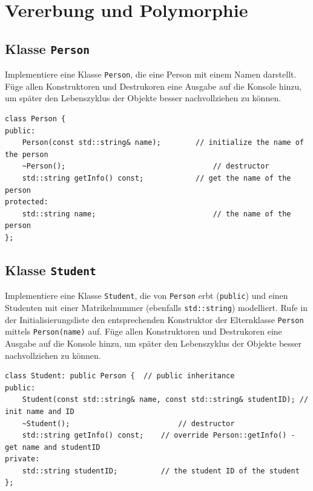 

\newcommand{\exday}{3}

\cppSetTitle



\cppSetHeaderAndMakeTitle

\section{Vererbung und Polymorphie}
\subsection{Klasse \texttt{Person}}
Implementiere eine Klasse \texttt{Person}, die eine Person mit einem Namen darstellt.
Füge allen Konstruktoren und Destrukoren eine Ausgabe auf die Konsole hinzu, um später den Lebenszyklus der Objekte besser nachvollziehen zu können.

\begin{lstlisting}
class Person {
public:
	Person(const std::string& name);		// initialize the name of the person
	~Person();									// destructor
	std::string getInfo() const;			// get the name of the person
protected:
	std::string name;							// the name of the person
};
\end{lstlisting}


\subsection{Klasse \texttt{Student}}
Implementiere eine Klasse \texttt{Student}, die von \texttt{Person} erbt (\texttt{public}) und einen Studenten mit einer Matrikelnummer (ebenfalls \texttt{std::string}) modelliert.
Rufe in der Initialisierungsliste den entsprechenden Konstruktor der Elternklasse \texttt{Person} mittels \texttt{Person(name)} auf.
Füge allen Konstruktoren und Destrukoren eine Ausgabe auf die Konsole hinzu, um später den Lebenszyklus der Objekte besser nachvollziehen zu können.

\begin{lstlisting}
class Student: public Person {	// public inheritance
public:
	Student(const std::string& name, const std::string& studentID); // init name and ID
	~Student();							// destructor
	std::string getInfo() const;	// override Person::getInfo() - get name and studentID
private:
	std::string studentID;			// the student ID of the student
};
\end{lstlisting}

